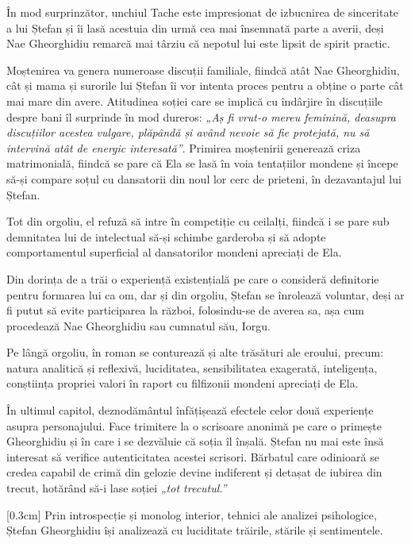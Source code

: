 \documentclass[
12pt,                        %
a4paper                      %
]{article}
\begin{document}
În mod surprinzător, unchiul Tache este impresionat de izbucnirea de sinceritate a lui Ștefan și îi lasă acestuia din urmă cea mai însemnată parte a averii, deși Nae Gheorghidiu remarcă mai târziu că nepotul lui este lipsit de spirit practic.

Moștenirea va genera numeroase discuții familiale, fiindcă atât Nae Gheorghidiu, cât și mama și surorile lui Ștefan îi vor intenta proces pentru a obține o parte cât mai mare din avere. Atitudinea soției care se implică cu îndârjire în discuțiile despre bani îl surprinde în mod dureros: \textit{„Aș fi vrut-o mereu feminină, deasupra discuțiilor acestea vulgare, plăpândă și având nevoie să fie protejată, nu să intervină atât de energic interesată”}. Primirea moștenirii generează criza matrimonială, fiindcă se pare că Ela se lasă în voia tentațiilor mondene și începe să-și compare soțul cu dansatorii din noul lor cerc de prieteni, în dezavantajul lui Ștefan.

Tot din orgoliu, el refuză să intre în competiție cu ceilalți, fiindcă i se pare sub demnitatea lui de intelectual să-și schimbe garderoba și să adopte comportamentul superficial al dansatorilor mondeni apreciați de Ela.

Din dorința de a trăi o experiență existențială pe care o consideră definitorie pentru formarea lui ca om, dar și din orgoliu, Ștefan se înrolează voluntar, deși ar fi putut să evite participarea la război, folosindu-se de averea sa, așa cum procedează Nae Gheorghidiu sau cumnatul său, Iorgu.

Pe lângă orgoliu, în roman se conturează și alte trăsături ale eroului, precum: natura analitică și reflexivă, luciditatea, sensibilitatea exagerată, inteligența, conștiința propriei valori în raport cu filfizonii mondeni apreciați de Ela.

În ultimul capitol, deznodământul înfățișează efectele celor două experiențe asupra personajului. Face trimitere la o scrisoare anonimă pe care o primește Gheorghidiu și în care i se dezvăluie că soția îl înșală. Ștefan nu mai este însă interesat să verifice autenticitatea acestei scrisori. Bărbatul care odinioară se credea capabil de crimă din gelozie devine indiferent și detașat de iubirea din trecut, hotărând să-i lase soției \textit{„tot trecutul.”}

[0.3cm]
Prin introspecție și monolog interior, tehnici ale analizei psihologice, Ștefan Gheorghidiu își analizează cu luciditate trăirile, stările și sentimentele.
\end{document}
